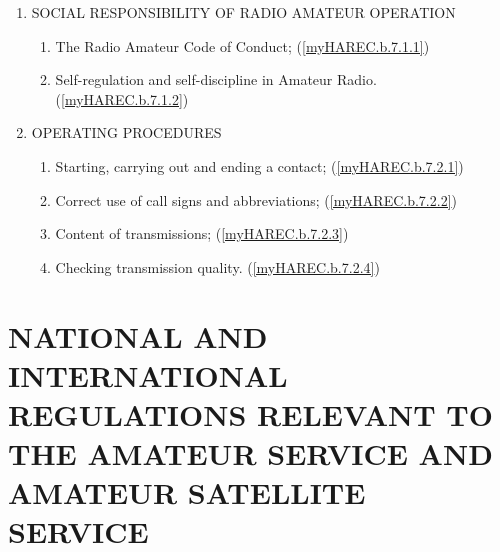 \begin{enumerate}[noitemsep]
\begin{enumerate}
\item SOCIAL RESPONSIBILITY OF RADIO AMATEUR OPERATION
\begin{enumerate}
\item The Radio Amateur Code of Conduct; (\ref{myHAREC.b.7.1.1})\label{HAREC.b.7.1.1}
\item Self-regulation and self-discipline in Amateur Radio. (\ref{myHAREC.b.7.1.2})\label{HAREC.b.7.1.2}
\end{enumerate}
\item OPERATING PROCEDURES
\begin{enumerate}
\item Starting, carrying out and ending a contact; (\ref{myHAREC.b.7.2.1})\label{HAREC.b.7.2.1}
\item Correct use of call signs and abbreviations; (\ref{myHAREC.b.7.2.2})\label{HAREC.b.7.2.2}
\item Content of transmissions; (\ref{myHAREC.b.7.2.3})\label{HAREC.b.7.2.3}
\item Checking transmission quality. (\ref{myHAREC.b.7.2.4})\label{HAREC.b.7.2.4}
\end{enumerate}
\end{enumerate}

\end{enumerate}

\section{NATIONAL AND INTERNATIONAL REGULATIONS RELEVANT TO THE AMATEUR SERVICE AND AMATEUR SATELLITE SERVICE}


